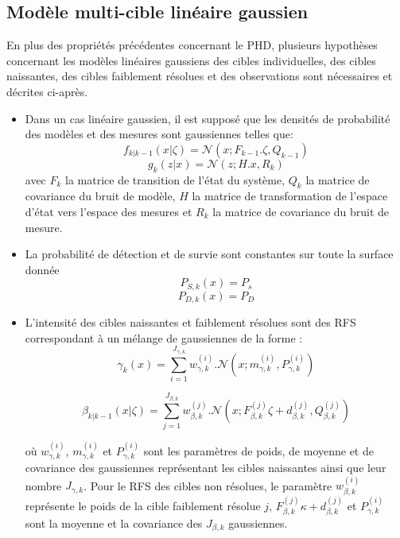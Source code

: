 \documentclass[10pt,french,a4paper]{report}
\begin{document}
\subsection{Modèle multi-cible linéaire gaussien}
\label{MMC_lineairegaussien}
En plus des propriétés précédentes concernant le PHD, plusieurs hypothèses concernant les modèles linéaires gaussiens des cibles individuelles, des cibles naissantes, des cibles faiblement résolues et des observations sont nécessaires et décrites ci-après.  

\begin{itemize}
\item Dans un cas linéaire gaussien, il est supposé que les densités de probabilité des modèles et des mesures sont gaussiennes telles que:
\begin{equation}
 f_{k|k-1}(x|\zeta)=\mathcal{N}(x;F_{k-1}.\zeta,Q_{k-1})
\end{equation}
\begin{equation}
 g_k(z|x)=\mathcal{N}(z;H.x,R_k)
\end{equation}
avec $F_k$ la matrice de transition de l'état du système, $Q_k$ la matrice de covariance du bruit de modèle, $H$ la matrice de transformation de l'espace d'état vers l'espace des mesures et $R_k$ la matrice de covariance du bruit de mesure.
\item La probabilité de détection et de survie sont constantes sur toute la surface donnée 
\begin{equation}
 P_{S,k}(x)=P_{s}
\end{equation}
\begin{equation}
 P_{D,k}(x)=P_{D}
\end{equation}
\item L'intensité des cibles naissantes et faiblement résolues sont des RFS correspondant à un mélange de gaussiennes de la forme :
\begin{equation}
 \gamma_k(x)=\sum\limits_{i=1}^{J_{\gamma,k}}w_{\gamma,k}^{(i)}.\mathcal{N}\left(x;m_{\gamma,k}^{(i)},P_{\gamma,k}^{(i)} \right) 
 \label{RFS_naissance}
\end{equation}

\begin{equation}
 \beta_{k|k-1}(x|\zeta)=\sum\limits_{j=1}^{J_{\beta,k}}w_{\beta,k}^{(j)}.\mathcal{N}\left(x;F_{\beta,k}^{(j)}\zeta + d_{\beta,k}^{(j)},Q_{\beta,k}^{(j)}\right) 
 \label{RFS_naissance}
\end{equation}

où $w_{\gamma,k}^{(i)}$, $m_{\gamma,k}^{(i)}$ et $P_{\gamma,k}^{(i)}$ sont les paramètres de poids, de moyenne et de covariance des gaussiennes représentant les cibles naissantes ainsi que leur nombre $J_{\gamma,k}$. Pour le \ac{RFS} des cibles non résolues, le paramètre $w_{\beta,k}^{(i)}$ représente le poids de la cible faiblement résolue $j$, $F_{\beta,k}^{(j)}\kappa+d_{\beta,k}^{(j)}$ et $P_{\gamma,k}^{(i)}$ sont la moyenne et la covariance des $J_{\beta,k}$ gaussiennes.
 
\end{itemize}
\end{document}
